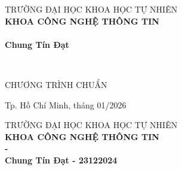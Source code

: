 \begin{titlepage}

\begin{center}
TRƯỜNG ĐẠI HỌC KHOA HỌC TỰ NHIÊN\\
\textbf{KHOA CÔNG NGHỆ THÔNG TIN}\\[2cm]


{ \Large \bfseries \tenSV\\}
{ \Large \bfseries Chung Tín Đạt\\[2cm] } 


{ \Large \bfseries \tenKL\\[3cm]} 


\large CHƯƠNG TRÌNH CHUẨN\\



\vfill
Tp. Hồ Chí Minh, tháng 01/2026

\end{center}

\pagebreak



\begin{center}

TRƯỜNG ĐẠI HỌC KHOA HỌC TỰ NHIÊN\\
\textbf{KHOA CÔNG NGHỆ THÔNG TIN}\\[2cm]


{\large \bfseries \tenSV  - \mssv\\} 
{\large \bfseries Chung Tín Đạt - 23122024\\[2cm]} 


\end{center}
\end{titlepage}
